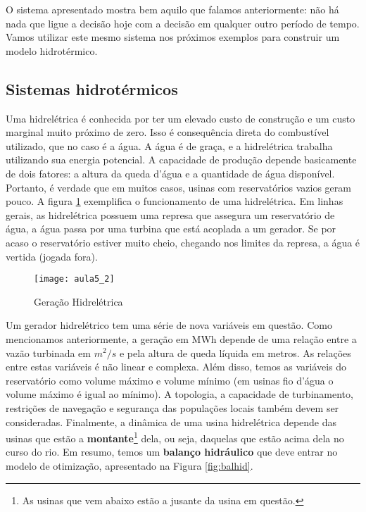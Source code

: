 O sistema apresentado mostra bem aquilo que falamos anteriormente: não há nada que ligue a decisão hoje com a decisão em qualquer outro período de tempo. Vamos utilizar este mesmo sistema nos próximos exemplos para construir um modelo hidrotérmico.

\subsection{Sistemas hidrotérmicos}

Uma hidrelétrica é conhecida por ter um elevado custo de construção e um custo marginal muito próximo de zero. Isso é consequência direta do combustível utilizado, que no caso é a água. A água é de graça, e a hidrelétrica trabalha utilizando sua energia potencial. A capacidade de produção depende basicamente de dois fatores: a altura da queda d'água e a quantidade de água disponível. Portanto, é verdade que em muitos casos, usinas com reservatórios vazios geram pouco. A figura \ref{fig:hidro} exemplifica o funcionamento de uma hidrelétrica. Em linhas gerais, as hidrelétrica possuem uma represa que assegura um reservatório de água, a água passa por uma turbina que está acoplada a um gerador. Se por acaso o reservatório estiver muito cheio, chegando nos limites da represa, a água é vertida (jogada fora).  

\begin{figure}[H]
\begin{centering}
\texttt{[image: aula5\_2]}\protect\caption{\label{fig:hidro} Geração Hidrelétrica}
\end{centering}
\end{figure}

Um gerador hidrelétrico tem uma série de nova variáveis em questão. Como mencionamos anteriormente, a geração em MWh depende de uma relação entre a vazão turbinada em $m^2/s$ e pela altura de queda líquida em metros. As relações entre estas variáveis é não linear e complexa. Além disso, temos as variáveis do reservatório como volume máximo e volume mínimo (em usinas fio d'água o volume máximo é igual ao mínimo). A topologia, a capacidade de turbinamento, restrições de navegação e segurança das populações locais também devem ser consideradas. Finalmente, a dinâmica de uma usina hidrelétrica depende das usinas que estão a \textbf{montante}\footnote{As usinas que vem abaixo estão a jusante da usina em questão.} dela, ou seja, daquelas que estão acima dela no curso do rio. Em resumo, temos um \textbf{balanço hidráulico} que deve entrar no modelo de otimização, apresentado na Figura \ref{fig:balhid}. 

